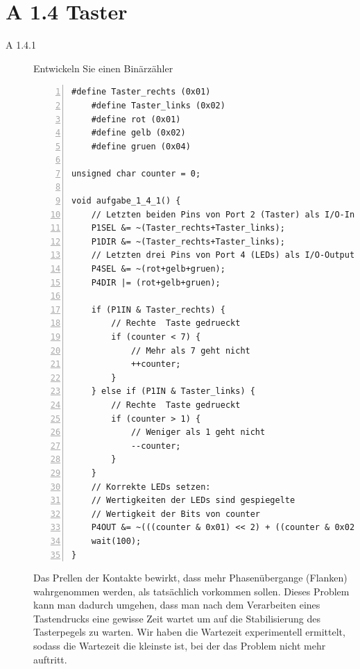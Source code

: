 \documentclass[11pt,a4paper,ngerman]{article}
\begin{document}
\newpage
\section*{A 1.4 Taster}
\begin{description}
\item[A 1.4.1] Entwickeln Sie einen Binärzähler \\

\begin{lstlisting}[numbers=left]
	#define Taster_rechts (0x01)
	#define Taster_links (0x02)
	#define rot (0x01)
	#define gelb (0x02)
	#define gruen (0x04)
	
unsigned char counter = 0;
	
void aufgabe_1_4_1() {
	// Letzten beiden Pins von Port 2 (Taster) als I/O-Input verwenden
	P1SEL &= ~(Taster_rechts+Taster_links);
	P1DIR &= ~(Taster_rechts+Taster_links);
	// Letzten drei Pins von Port 4 (LEDs) als I/O-Output verwenden
	P4SEL &= ~(rot+gelb+gruen);
	P4DIR |= (rot+gelb+gruen);
	
	if (P1IN & Taster_rechts) {
		// Rechte  Taste gedrueckt
		if (counter < 7) {
			// Mehr als 7 geht nicht
			++counter;
		}
	} else if (P1IN & Taster_links) {
		// Rechte  Taste gedrueckt
		if (counter > 1) {
			// Weniger als 1 geht nicht
			--counter;
		}
	}
	// Korrekte LEDs setzen:
	// Wertigkeiten der LEDs sind gespiegelte
	// Wertigkeit der Bits von counter
	P4OUT &= ~(((counter & 0x01) << 2) + ((counter & 0x02) << 1) + (counter & 0x04))
	wait(100);
}
\end{lstlisting}
Das Prellen der Kontakte bewirkt, dass mehr Phasenübergange (Flanken) wahrgenommen werden, als tatsächlich vorkommen sollen. Dieses Problem kann man dadurch umgehen, dass man nach dem Verarbeiten eines Tastendrucks eine gewisse Zeit wartet um auf die Stabilisierung des Tasterpegels zu warten. Wir haben die Wartezeit experimentell ermittelt, sodass die Wartezeit die kleinste ist, bei der das Problem nicht mehr auftritt.
\end{description}
\label{LastPage}
\end{document}
